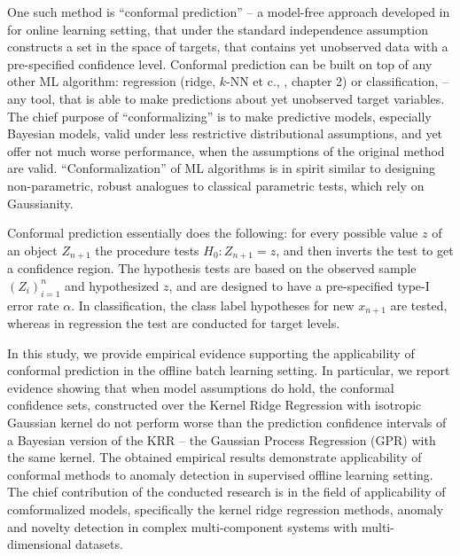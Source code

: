 \documentclass[a4paper,14pt]{extarticle}
\begin{document}
One such method is ``conformal prediction'' -- a model-free approach developed in
\cite{vovk2005} for online learning setting, that under the standard independence
assumption constructs a set in the space of targets, that contains yet unobserved
data with a pre-specified confidence level. Conformal prediction can be built on
top of any other ML algorithm: regression (ridge, $k$-NN et c., \cite{vovk2005},
chapter 2) or classification, -- any tool, that is able to make predictions about
yet unobserved target variables. The chief purpose of ``conformalizing'' is to make
predictive models, especially Bayesian models, valid under less restrictive distributional
assumptions, and yet offer not much worse performance, when the assumptions of the
original method are valid. ``Conformalization'' of ML algorithms is in spirit similar
to designing non-parametric, robust analogues to classical parametric tests, which
rely on Gaussianity.

Conformal prediction essentially does the following: for every possible value $z$
of an object $Z_{n+1}$ the procedure tests $H_0: Z_{n+1}=z$, and then inverts the
test to get a confidence region. The hypothesis tests are based on the observed sample
$(Z_i)_{i=1}^n$ and hypothesized $z$, and are designed to have a pre-specified type-I
error rate $\alpha$. In classification, the class label hypotheses for new $x_{n+1}$
are tested, whereas in regression the test are conducted for target levels.

In this study, we provide empirical evidence supporting the applicability of conformal
prediction in the offline batch learning setting. In particular, we report evidence
showing that when model assumptions do hold, the conformal confidence sets, constructed
over the Kernel Ridge Regression with isotropic Gaussian kernel do not perform worse
than the prediction confidence intervals of a Bayesian version of the KRR -- the
Gaussian Process Regression (GPR) with the same kernel. The obtained empirical results
demonstrate applicability of conformal methods to anomaly detection in supervised
offline learning setting. The chief contribution of the conducted research is in
the field of applicability of comformalized models, specifically the kernel ridge
regression methods, anomaly and novelty detection in complex multi-component systems
with multi-dimensional datasets.
\end{document}
